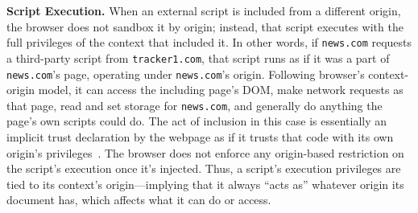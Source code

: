 \noindent \textbf{Script Execution.} 
%
When an external script is included from a different origin, the browser does not sandbox it by origin; instead, that script executes with the full privileges of the context that included it. 
%
In other words, if \texttt{news.com} requests a third-party script from \texttt{tracker1.com}, that script runs as if it was a part of \texttt{news.com}’s page, operating under \texttt{news.com}’s origin. 
%
Following browser's context-origin model, it can access the including page’s DOM, make network requests as that page, read and set storage for \texttt{news.com}, and generally do anything the page’s own scripts could do. 
%
The act of inclusion in this case is essentially an implicit trust declaration by the webpage as if it trusts that code with its own origin’s privileges~\cite{TrackingPreventionWebKit2020}. 
%
The browser does not enforce any origin-based restriction on the script’s execution once it’s injected.
%
Thus, a script's execution privileges are tied to its context’s origin---implying that it always ``acts as'' whatever origin its document has, which affects what it can do or access.




